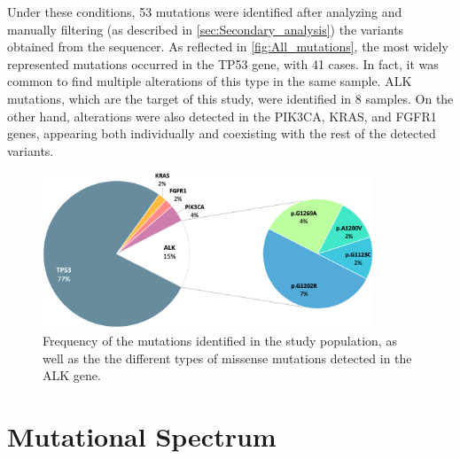 Under these conditions, 53 mutations were identified after analyzing and manually filtering (as described in \autoref{sec:Secondary_analysis}) the variants obtained from the sequencer. As reflected in \autoref{fig:All_mutations}, the most widely represented mutations occurred in the TP53 gene, with 41 cases. In fact, it was common to find multiple alterations of this type in the same sample. ALK mutations, which are the target of this study, were identified in 8 samples. On the other hand, alterations were also detected in the PIK3CA, KRAS, and FGFR1 genes, appearing both individually and coexisting with the rest of the detected variants.

\begin{figure}[ht]
    \centering
    \includegraphics[width=0.88\textwidth]{Images/chapter_4/all_mutations.png}
    \caption{Frequency of the mutations identified in the study population, as well as the the different types of missense mutations detected in the ALK gene.}
    \label{fig:All_mutations}
\end{figure}


\section{Mutational Spectrum}


 

